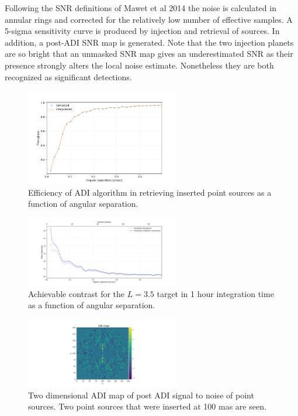 Following the SNR definitions of Mawet et al 2014 the noise is calculated in annular rings and corrected for the relatively low number of effective samples. A 5-sigma sensitivity curve is produced by injection and retrieval of sources. In addition, a post-ADI SNR map is generated. Note that the two injection planets are so bright that an unmasked SNR map gives an underestimated SNR as their presence strongly alters the local noise estimate. Nonetheless they are both recognized as significant detections.

\begin{figure}[!ht]
  \centering
  \includegraphics[width=0.6\textwidth]{./figures/adi_throughput.png}
  \caption{Efficiency of ADI algorithm in retrieving inserted point sources as a function of angular separation.}
\end{figure}

\begin{figure}[!ht]
  \centering
  \includegraphics[width=0.6\textwidth]{./figures/adi_contrast.png}
  \caption{Achievable contrast for the $L=3.5$ target in 1 hour integration time as a function of angular separation.}
\end{figure}

\begin{figure}[!ht]
  \centering
  \includegraphics[width=0.6\textwidth]{./figures/adi_snrmap.png}
  \caption[Two dimensional ADI map of post ADI signal to noise of point sources]{Two dimensional ADI map of post ADI signal to noise of point sources. Two point sources that were inserted at 100 mas are seen.}
\end{figure}

